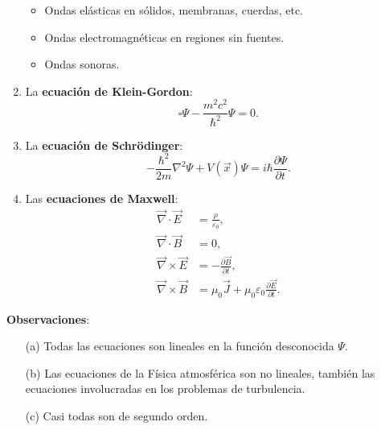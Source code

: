\begin{enumerate}
    \begin{itemize}
        \item Ondas elásticas en sólidos, membranas, cuerdas, etc.
        \item Ondas electromagnéticas en regiones sin fuentes.
        
    \item Ondas sonoras.
    \end{itemize}
    
    \item La \textbf{ecuación de Klein-Gordon}:
    \begin{equation}
        \square \Psi - \frac{m^2 c^2}{\hbar^2} \Psi = 0.    \label{EcKlein}
    \end{equation}
    
      \item La \textbf{ecuación de Schrödinger}:
         \begin{equation}
       - \frac{\hbar^2}{2m} \nabla^2 \Psi + V(\Vec{x}) \Psi = i \hbar \frac{\partial \Psi}{\partial t}.    \label{EcSchrödinger}
    \end{equation}
    
    \newpage
    \item Las \textbf{ecuaciones de Maxwell}:
    \begin{align}
        \Vec{\nabla} \cdot \Vec{E} &= \frac{\rho}{\varepsilon_0}, \\
        \Vec{\nabla} \cdot \Vec{B} &= 0, \\
        \Vec{\nabla} \times \Vec{E} &= - \frac{\partial \Vec{B}}{\partial t}, \\
         \Vec{\nabla} \times \Vec{B} &= \mu_0 \Vec{J} + \mu_0 \varepsilon_0 \frac{\partial \Vec{E}}{\partial t}.
    \end{align}
    \end{enumerate}
    
    \textbf{Observaciones}:
    
    \begin{itemize}
        \item[(a)] Todas las ecuaciones son lineales en la función desconocida $\Psi$.
        
        \item[(b)] Las ecuaciones de la Física atmosférica son no lineales, también las ecuaciones involucradas en los problemas de turbulencia.
        
        \item[(c)] Casi todas son de segundo orden.
    \end{itemize}
    
